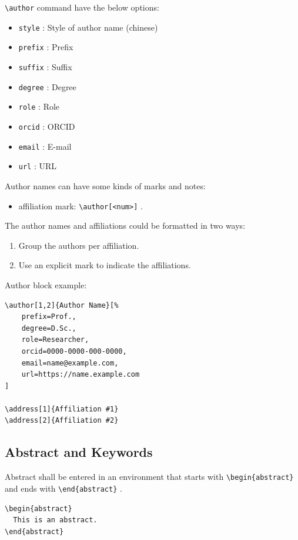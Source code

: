 \documentclass[%
twocolumn
]{ceurart}
\begin{document}
\verb|\author|
command have the below options:
\begin{itemize}
\item
\verb|style|
 : Style of author name (chinese)
\item
\verb|prefix|
 : Prefix
\item
\verb|suffix|
 : Suffix
\item
\verb|degree|
 : Degree
\item
\verb|role|
 : Role
\item
\verb|orcid|
 : ORCID
\item
\verb|email|
 : E-mail
\item
\verb|url|
 : URL
\end{itemize}

Author names can have some kinds of marks and notes:
\begin{itemize}
\item affiliation mark:
\verb|\author[<num>]|
.
\end{itemize}

The author names and affiliations could be formatted in two ways:
\begin{enumerate}
\item Group the authors per affiliation.
\item Use an explicit mark to indicate the affiliations.
\end{enumerate}

Author block example:
\begin{lstlisting}[language={[latex]TeX}]
\author[1,2]{Author Name}[%
    prefix=Prof.,
    degree=D.Sc.,
    role=Researcher,
    orcid=0000-0000-000-0000,
    email=name@example.com,
    url=https://name.example.com
]

\address[1]{Affiliation #1}
\address[2]{Affiliation #2}
\end{lstlisting}

\subsection{Abstract and Keywords}

Abstract shall be entered in an environment that starts with
\verb|\begin{abstract}|
 and ends with
\verb|\end{abstract}|
.

\begin{lstlisting}[language={[latex]TeX}]
\begin{abstract}
  This is an abstract.
\end{abstract}
\end{lstlisting}
\end{document}
